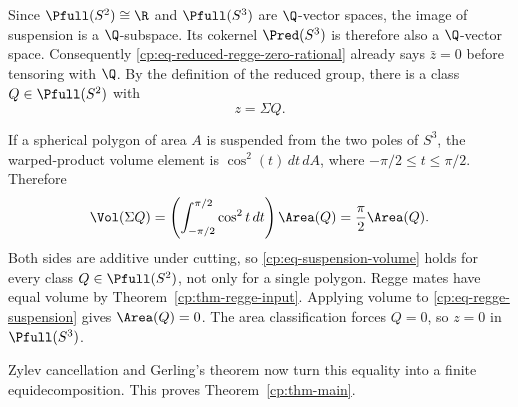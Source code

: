 Since \(\Pfull(S^2)\cong\R\) and \(\Pfull(S^3)\) are \(\Q\)-vector
spaces, the image of suspension is a \(\Q\)-subspace.  Its cokernel
\(\Pred(S^3)\) is therefore also a \(\Q\)-vector space.  Consequently
\eqref{cp:eq-reduced-regge-zero-rational} already says
\(\bar z=0\) before tensoring with \(\Q\).  By the definition of the
reduced group, there is a class \(Q\in\Pfull(S^2)\) with
\begin{equation}
 z=\Sigma Q.
 \label{cp:eq-regge-suspension}
\end{equation}

If a spherical polygon of area \(A\) is suspended from the two poles of
\(S^3\), the warped-product volume element is
\(\cos^2(t)\,dt\,dA\), where \(-\pi/2\leq t\leq\pi/2\).  Therefore
\begin{equation}
 \Vol(\Sigma Q)
 =\left(\int_{-\pi/2}^{\pi/2}\cos^2t\,dt\right)\Area(Q)
 =\frac\pi2\Area(Q).
 \label{cp:eq-suspension-volume}
\end{equation}
Both sides are additive under cutting, so
\eqref{cp:eq-suspension-volume} holds for every class
\(Q\in\Pfull(S^2)\), not only for a single polygon.
Regge mates have equal volume by Theorem~\ref{cp:thm-regge-input}.  Applying
volume to \eqref{cp:eq-regge-suspension} gives \(\Area(Q)=0\).  The area
classification forces \(Q=0\), so \(z=0\) in \(\Pfull(S^3)\).

Zylev cancellation and Gerling's theorem now turn this equality into a
finite equidecomposition.  This proves Theorem~\ref{cp:thm-main}.
